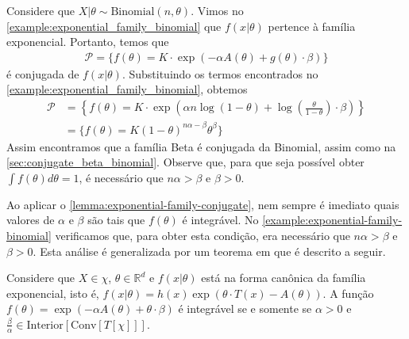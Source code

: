 \begin{example}
 \label{example:exponential-family-binomial}
 Considere que
 $X|\theta \sim \text{Binomial}(n,\theta)$.
 Vimos no \cref{example:exponential_family_binomial}
 que $f(x|\theta)$ pertence à família exponencial.
 Portanto, temos que
 \begin{align*}
  \mathcal{P} = \{f(\theta) =K
  \cdot \exp\left(-\alpha A(\theta)
  +g(\theta) \cdot \beta \right) \}
 \end{align*}
 é conjugada de $f(x|\theta)$.
 Substituindo os termos encontrados no
 \cref{example:exponential_family_binomial}, obtemos
 \begin{align*}
  \mathcal{P} &= \left\{f(\theta) = K \cdot \exp\left(\alpha n\log(1-\theta) +\log\left(\frac{\theta}{1-\theta}\right) \cdot \beta \right) \right\} \\
  &= \{f(\theta) = K(1-\theta)^{n\alpha-\beta} \theta^{\beta} \}
 \end{align*}
 Assim encontramos que a família Beta é
 conjugada da Binomial, assim como na
 \cref{sec:conjugate_beta_binomial}.
 Observe que, para que seja possível obter
 $\int{f(\theta)d\theta}=1$, é necessário que
 $n\alpha > \beta$ e $\beta > 0$. 
\end{example}

Ao aplicar o \cref{lemma:exponential-family-conjugate},
nem sempre é imediato quais valores de
$\alpha$ e $\beta$ são tais que
$f(\theta)$ é integrável.
No \cref{example:exponential-family-binomial}
verificamos que, para obter esta condição, era
necessário que $n\alpha > \beta$ e $\beta > 0$.
Esta análise é generalizada por um teorema em \citet{Diaconis1979} que é descrito a seguir.

\begin{theorem}
 \label{theorem:exponencial-propriety}
 Considere que $X \in \chi$,
 $\theta \in \mathbb{R}^{d}$ e
 $f(x|\theta)$ está na forma canônica da
 família exponencial, isto é,
 $f(x|\theta) = h(x) \exp\left(\theta \cdot T(x) - A(\theta)\right)$.
 A função $f(\theta) = \exp\left(-\alpha A(\theta) +\theta \cdot \beta \right)$
 é integrável se e somente se $\alpha > 0$ e
 $\frac{\beta}{\alpha} \in \text{Interior}[\text{Conv}[T[\chi]]]$.
\end{theorem}

